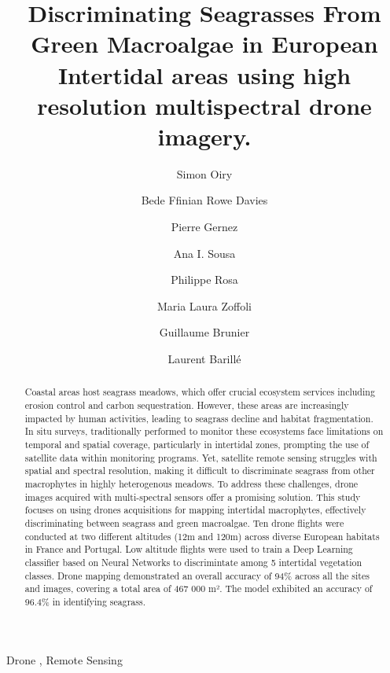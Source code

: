 \documentclass[
  number]{elsarticle}
\begin{document}
\begin{frontmatter}
\title{Discriminating Seagrasses From Green Macroalgae in European
Intertidal areas using high resolution multispectral drone imagery.}
\author[1]{Simon Oiry%
%
}
\author[1]{Bede Ffinian Rowe Davies%
%
}

\author[1]{Pierre Gernez%
%
}

\author[2]{Ana I. Sousa%
%
}

\author[1]{Philippe Rosa%
%
}

\author[3]{Maria Laura Zoffoli%
%
}

\author[4]{Guillaume Brunier%
%
}

\author[1]{Laurent Barillé%
%
}











        
\begin{abstract}
Coastal areas host seagrass meadows, which offer crucial ecosystem
services including erosion control and carbon sequestration. However,
these areas are increasingly impacted by human activities, leading to
seagrass decline and habitat fragmentation. In situ surveys,
traditionally performed to monitor these ecosystems face limitations on
temporal and spatial coverage, particularly in intertidal zones,
prompting the use of satellite data within monitoring programs. Yet,
satellite remote sensing struggles with spatial and spectral resolution,
making it difficult to discriminate seagrass from other macrophytes in
highly heterogenous meadows. To address these challenges, drone images
acquired with multi-spectral sensors offer a promising solution. This
study focuses on using drones acquisitions for mapping intertidal
macrophytes, effectively discriminating between seagrass and green
macroalgae. Ten drone flights were conducted at two different altitudes
(12m and 120m) across diverse European habitats in France and Portugal.
Low altitude flights were used to train a Deep Learning classifier based
on Neural Networks to discrimintate among 5 intertidal vegetation
classes. Drone mapping demonstrated an overall accuracy of 94\% across
all the sites and images, covering a total area of 467 000 m². The model
exhibited an accuracy of 96.4\% in identifying seagrass.
\end{abstract}





\begin{keyword}
    Drone \sep 
    Remote Sensing
\end{keyword}
\end{frontmatter}
    
\end{document}
